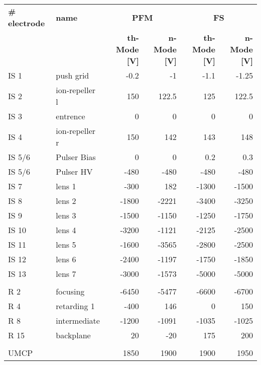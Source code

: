 	\begin{small}
	\begin{table}[H]
		\centering
		\begin{tabular}{|ll|rrrr|}
			\hline
			\textbf{\# electrode} & \textbf{name}   & \multicolumn{2}{c}{\textbf{PFM}} & \multicolumn{2}{c|}{\textbf{FS}} \\
			& & \textbf{th-Mode [V]} & \textbf{n-Mode [V]} & \textbf{th-Mode  [V]} & \textbf{n-Mode [V]} \\
			\hline
			IS 1          & push grid       &  -0.2 &    -1 &  -1.1 & -1.25 \\
			IS 2          & ion-repeller l  &   150 & 122.5 &   125 & 122.5 \\
			IS 3          & entrence        &    0 &      0 &     0 &     0 \\
			IS 4          & ion-repeller r  &   150 &   142 &   143 &   148 \\
			IS 5/6        & Pulser Bias     &     0 &     0 &   0.2 &   0.3 \\
			IS 5/6        & Pulser HV       &  -480 &  -480 &  -480 &  -480 \\
			IS 7          & lens 1          &  -300 &   182 & -1300 & -1500 \\
			IS 8          & lens 2          & -1800 & -2221 & -3400 & -3250 \\
			IS 9          & lens 3          & -1500 & -1150 & -1250 & -1750 \\
			IS 10         & lens 4          & -3200 & -1121 & -2125 & -2500 \\
			IS 11         & lens 5          & -1600 & -3565 & -2800 & -2500 \\
			IS 12         & lens 6          & -2400 & -1197 & -1750 & -1850 \\
			IS 13         & lens 7          & -3000 & -1573 & -5000 & -5000 \\
						  &                 &       &       &       &       \\
			R 2           & focusing        & -6450 & -5477 & -6600 & -6700 \\
			R 4           & retarding 1     &  -400 &   146 &     0 &   150 \\
			R 8           & intermediate    & -1200 & -1091 & -1035 & -1025 \\
			R 15          & backplane       &    20 &   -20 &   175 &   200 \\
						  &                 &       &       &       &       \\
			UMCP          &                 &  1850 &  1900 &  1900 &  1950 \\

\end{tabular}
\end{table}
\end{small}
